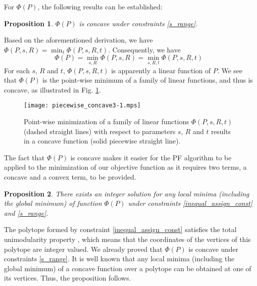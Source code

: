 \documentclass[11pt,bezier,]{article}
\newtheorem{proposition}{Proposition}
\begin{document}
For $\Phi(P)$, 
the following results can be established:

\begin{proposition} \label{Prop_one}
$\Phi(P)$ is  concave under constraints \eqref{s_range}. 
\end{proposition}

{\proof
Based on the aforementioned derivation, %
we have $\Phi(P,s,R )=\min_{{ t}} \Phi (P,s,R,{ t})$.
Consequently, we have  
\[\Phi(P)=\min_{s,R} \Phi(P,s,R)=
\min_{s,R,{ t}} \Phi(P,s,R,{ t})\]
For each $s$, $R$ and ${ t}$, 
$\Phi(P,s,R,{ t})$ is apparently  a linear function of $P$.
We see that $\Phi(P)$ is the point-wise minimum of a family
of linear functions,
and thus is concave, as illustrated in Fig. \ref{linear_min}.
}



\begin{figure}[h]
\centering
 \texttt{[image: piecewise\_concave3-1.mps]}  %
 \caption{ 
Point-wise minimization of a family of linear functions $\Phi(P,s,R,t)$ (dashed  straight lines)
with respect to parameters $s$, $R$ and $t$ results in a concave function (solid piecewise straight line).
\label{linear_min}
}
\end{figure}

The fact that $\Phi(P)$ is concave makes it easier for 
the PF algorithm to be applied to the minimization of our objective function
as it requires two terms, a concave and a convex term, to be provided.


\begin{proposition}
There exists an integer solution for any local minima (including the global minimum) of function
$\Phi(P)$ under constraints \eqref{inequal_assign_const} and \eqref{s_range}.
\end{proposition}

{\proof
The polytope formed by  constraint \eqref{inequal_assign_const}
satisfies the total unimodularity property \cite{book_comb_optimize},
which means that the coordinates of the vertices of this polytope are integer valued.
We already proved that $\Phi(P)$ is concave under constraints 
\eqref{s_range}. 
It is well known that any local minima 
(including the global minimum)
of a concave function over a polytope can be obtained at one of its vertices.
Thus, the proposition follows.


}
\end{document}
